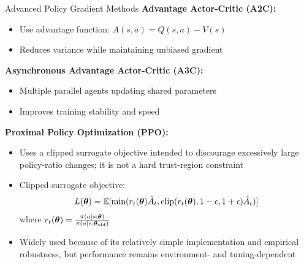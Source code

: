 \documentclass[aspectratio=169]{beamer}
\begin{document}
\begin{frame}{Advanced Policy Gradient Methods}
  \textbf{Advantage Actor-Critic (A2C):}
  \begin{itemize}
    \item Use advantage function: $A(s,a) = Q(s,a) - V(s)$
    \item Reduces variance while maintaining unbiased gradient
  \end{itemize}

  \vspace{0.5em}

  \textbf{Asynchronous Advantage Actor-Critic (A3C):}
  \begin{itemize}
    \item Multiple parallel agents updating shared parameters
    \item Improves training stability and speed
  \end{itemize}

  \vspace{0.5em}

  \textbf{Proximal Policy Optimization (PPO):}
  \begin{itemize}
    \item Uses a clipped surrogate objective intended to discourage excessively large policy-ratio changes; it is not a hard trust-region constraint
    \item Clipped surrogate objective:
    $$L(\boldsymbol{\theta}) = \mathbb{E}[\min(r_t(\boldsymbol{\theta})\hat{A}_t, \text{clip}(r_t(\boldsymbol{\theta}), 1-\epsilon, 1+\epsilon)\hat{A}_t)]$$
    where $r_t(\boldsymbol{\theta}) = \frac{\pi(a|s;\boldsymbol{\theta})}{\pi(a|s;\boldsymbol{\theta}_{\text{old}})}$
    \item Widely used because of its relatively simple implementation and empirical robustness, but performance remains environment- and tuning-dependent
  \end{itemize}
\end{frame}
\end{document}

